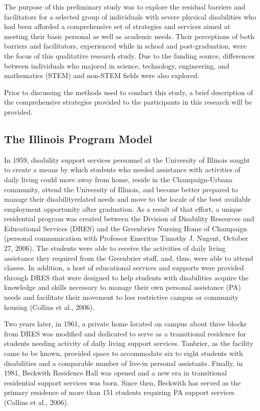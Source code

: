 \documentclass[11.5pt]{sig-alternate} %
\begin{document}
\begin{large}
The purpose of this preliminary study was to explore the residual barriers and facilitators for a selected group of individuals with severe physical disabilities who had been afforded a comprehensive set of strategies and services aimed at meeting their basic personal as well as academic needs. Their perceptions of both barriers and facilitators, experienced while in school and post-graduation, were the focus of this qualitative research study. Due to the funding source, differences between individuals who majored in science, technology, engineering, and mathematics (STEM) and non-STEM fields were also explored.

Prior to discussing the methods used to conduct this study, a brief description of the comprehensive strategies provided to the participants in this research will be provided.

\subsection*{The Illinois Program Model}
In 1959, disability support services personnel at the University of Illinois sought to create a means by which students who needed assistance with activities of daily living could move away from home, reside in the Champaign-Urbana community, attend the University of Illinois, and become better prepared to manage their disabilityrelated needs and move to the locale of the best available employment opportunity after graduation. As a result of that effort, a unique residential program was created between the Division of Disability Resources and Educational Services (DRES) and the Greenbrier Nursing Home of Champaign (personal communication with Professor Emeritus Timothy J. Nugent, October 27, 2006). The students were able to receive the activities of daily living assistance they required from the Greenbrier staff, and, thus, were able to attend classes. In addition, a host of educational services and supports were provided through DRES that were designed to help students with disabilities acquire the knowledge and skills necessary to manage their own personal assistance (PA) needs and facilitate their movement to less restrictive campus or community housing (Collins et al., 2006). 

Two years later, in 1961, a private home located on campus about three blocks from DRES was modified and dedicated to serve as a transitional residence for students needing activity of daily living support services. Tanbrier, as the facility came to be known, provided space to accommodate six to eight students with disabilities and a comparable number of live-in personal assistants. Finally, in 1981, Beckwith Residence Hall was opened and a new era in transitional residential support services was born. Since then, Beckwith has served as the primary residence of more than 151 students requiring PA support services (Collins et al., 2006). 


\end{large}
\end{document}
